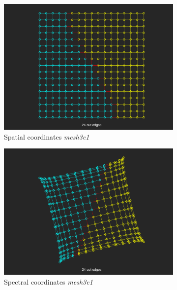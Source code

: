 \documentclass[unicode,11pt,a4paper,oneside,numbers=endperiod,openany]{scrartcl}
\begin{document}
\begin{enumerate}
\begin{figure}[h!]
\begin{subfigure}[b]{0.45\textwidth}
		\includegraphics[width=\textwidth]{images/mesh3e1_normal.png}
		\caption{Spatial coordinates \textit{mesh3e1}}
		\end{subfigure}
		\hfill
		\begin{subfigure}[b]{0.45\textwidth}
		\includegraphics[width=\textwidth]{images/mesh3e1_strange.png}
		\caption{Spectral coordinates \textit{mesh3e1}}
		\end{subfigure}
		\vfill
		\begin{subfigure}[b]{0.45\textwidth}

\end{subfigure}
\end{figure}
\end{enumerate}
\end{document}
